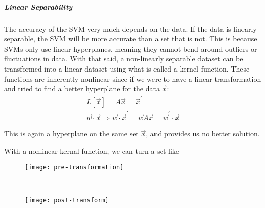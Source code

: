 \subparagraph{Linear Separability}
The accuracy of the SVM very much depends on the data. If the data is linearly separable, the SVM will be more accurate than a set that is not. This is because SVMs only use linear hyperplanes, meaning they cannot bend around outliers or fluctuations in data. With that said, a non-linearly separable dataset can be transformed into a linear dataset using what is called a kernel function. These functions are inherently nonlinear since if we were to have a linear transformation and tried to find a better hyperplane for the data $\vec{x}$:
\begin{equation}
\begin{gathered}
	L[\vec{x}] = A\vec{x} = \vec{x}^{'} \\
	\vec{w}\cdot \vec{x} \Rightarrow \vec{w} \cdot \vec{x}^{'} = \vec{w}A\vec{x} = \vec{w}^{'}\cdot\vec{x} 
\end{gathered}
\end{equation}

This is again a hyperplane on the same set $\vec{x}$, and provides us no better solution.

With a nonlinear kernal function, we can turn a set like 

\begin{figure*}[t!]
	\centering
	\begin{subfigure}[t]{0.5\textwidth}
		\texttt{[image: pre-transformation]}
		\caption{}
		\centering
		\label{fig:pre-trans}
	\end{subfigure}%
~
	\begin{subfigure}[t]{0.5\textwidth}
		\texttt{[image: post-transform]}
		\caption{}
			\centering
		\label{fig:post-trans}
	\end{subfigure}%

	\caption{The data before (\ref{fig:pre-trans}) and after (\ref{fig:post-trans}) the nonlinear kernal function was applied. It is now linearly separable and thus an SVM is a viable classifying tool \cite{matlab}}	
\end{figure*}


